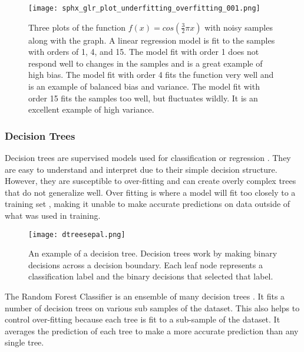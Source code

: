\begin{figure}[htp]
    \centering
    \texttt{[image: sphx\_glr\_plot\_underfitting\_overfitting\_001.png]}
    \caption[Figure describing bias and variance]{Three plots of the function \( f(x) = cos(\frac{3}{2} \pi x) \) with noisy samples along with the graph. 
    A linear regression model is fit to the samples with orders of 1, 4, and 15.
    The model fit with order 1 does not respond well to changes in the samples and is a great example of high bias.
    The model fit with order 4 fits the function very well and is an example of balanced bias and variance.
    The model fit with order 15 fits the samples too well, but fluctuates wildly. 
    It is an excellent example of high variance.}
    \label{}
\end{figure} 

\medskip

\subsubsection{Decision Trees}
Decision trees are supervised models used for classification or regression \cite{breiman2017classification}.
They are easy to understand and interpret due to their simple decision structure. 
However, they are susceptible to over-fitting and can create overly complex trees that do not generalize well.
Over fitting is where a model will fit too closely to a training set \cite{cawley2010over}, making it unable to make accurate predictions on data outside of what was used in training.

\begin{figure}[htp]
    \centering
    \texttt{[image: dtreesepal.png]}
    \caption[Figure depicting a decision tree model]{An example of a decision tree.
    Decision trees work by making binary decisions across a decision boundary.
    Each leaf node represents a classification label and the binary decisions that selected that label.}
    \label{}
\end{figure}

\par
The Random Forest Classifier is an ensemble of many decision trees \cite{breiman2001random}.
It fits a number of decision trees on various sub samples of the dataset.
This also helps to control over-fitting because each tree is fit to a sub-sample of the dataset.
It averages the prediction of each tree to make a more accurate prediction than any single tree.\\


